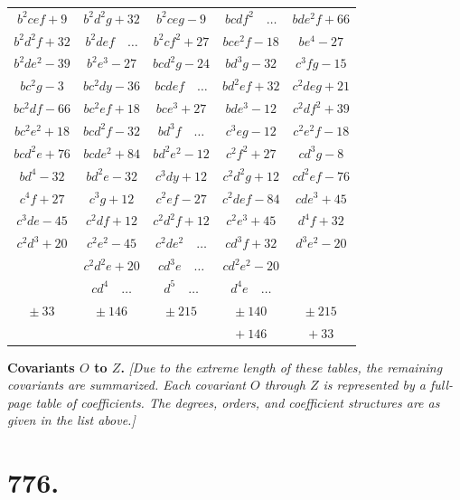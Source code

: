 \documentclass[11pt,a4paper]{book}
\begin{document}
\begin{center}
\begin{tabular}{|c|c|c|c|c|}
$b^{2}cef+9$ & $b^{2}d^{2}g+32$ & $b^{2}ceg-9$ & $bcdf^{2}\quad\dots$ & $bde^{2}f+66$ \\
$b^{2}d^{2}f+32$ & $b^{2}def\quad\dots$ & $b^{2}cf^{2}+27$ & $bce^{2}f-18$ & $be^{4}-27$ \\
$b^{2}de^{2}-39$ & $b^{2}e^{3}-27$ & $bcd^{2}g-24$ & $bd^{3}g-32$ & $c^{3}fg-15$ \\
$bc^{2}g-3$ & $bc^{2}dy-36$ & $bcdef\quad\dots$ & $bd^{2}ef+32$ & $c^{2}deg+21$ \\
$bc^{2}df-66$ & $bc^{2}ef+18$ & $bce^{3}+27$ & $bde^{3}-12$ & $c^{2}df^{2}+39$ \\
$bc^{2}e^{2}+18$ & $bcd^{2}f-32$ & $bd^{3}f\quad\dots$ & $c^{3}eg-12$ & $c^{2}e^{2}f-18$ \\
$bcd^{2}e+76$ & $bcde^{2}+84$ & $bd^{2}e^{2}-12$ & $c^{2}f^{2}+27$ & $cd^{3}g-8$ \\
$bd^{4}-32$ & $bd^{2}e-32$ & $c^{3}dy+12$ & $c^{2}d^{2}g+12$ & $cd^{2}ef-76$ \\
$c^{4}f+27$ & $c^{3}g+12$ & $c^{2}ef-27$ & $c^{2}def-84$ & $cde^{3}+45$ \\
$c^{3}de-45$ & $c^{2}df+12$ & $c^{2}d^{2}f+12$ & $c^{2}e^{3}+45$ & $d^{4}f+32$ \\
$c^{2}d^{3}+20$ & $c^{2}e^{2}-45$ & $c^{2}de^{2}\quad\dots$ & $cd^{3}f+32$ & $d^{3}e^{2}-20$ \\
 & $c^{2}d^{2}e+20$ & $cd^{3}e\quad\dots$ & $cd^{2}e^{2}-20$ &  \\
 & $cd^{4}\quad\dots$ & $d^{5}\quad\dots$ & $d^{4}e\quad\dots$ &  \\
\hline
$\pm\ 33$ & $\pm\ 146$ & $\pm\ 215$ & $\pm\ 140$ & $\pm\ 215$ \\
 &  &  & $+\ 146$ & $+\ 33$ \\
\hline
\end{tabular}
\end{center}

\textbf{Covariants $O$ to $Z$.} \textit{[Due to the extreme length of these tables, the remaining covariants are summarized. Each covariant $O$ through $Z$ is represented by a full-page table of coefficients. The degrees, orders, and coefficient structures are as given in the list above.]}

\newpage

\newpage

\section*{776.}
\end{document}

